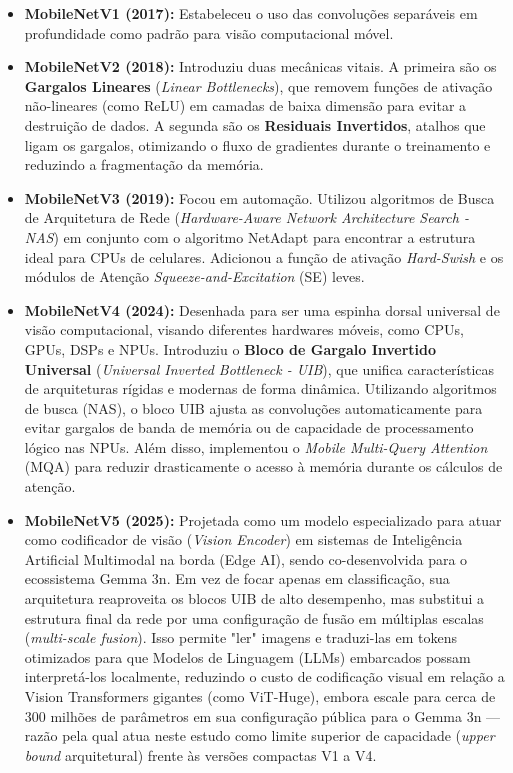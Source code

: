 \documentclass[oneside,english,brazilian]{UNISINOSmonografia}
\begin{document}
\begin{itemize}
    \item \textbf{MobileNetV1 (2017):} Estabeleceu o uso das convoluções separáveis em profundidade como padrão para visão computacional móvel. \cite{howard2017mobilenets_google}
        
    \item \textbf{MobileNetV2 (2018):} Introduziu duas mecânicas vitais. A primeira são os \textbf{Gargalos Lineares} (\textit{Linear Bottlenecks}), que removem funções de ativação não-lineares (como ReLU) em camadas de baixa dimensão para evitar a destruição de dados. A segunda são os \textbf{Residuais Invertidos}, atalhos que ligam os gargalos, otimizando o fluxo de gradientes durante o treinamento e reduzindo a fragmentação da memória. \cite{sandler2018mobilenetv2_google}
        
    \item \textbf{MobileNetV3 (2019):} Focou em automação. Utilizou algoritmos de Busca de Arquitetura de Rede (\textit{Hardware-Aware Network Architecture Search - NAS}) em conjunto com o algoritmo NetAdapt para encontrar a estrutura ideal para CPUs de celulares. Adicionou a função de ativação \textit{Hard-Swish} e os módulos de Atenção \textit{Squeeze-and-Excitation} (SE) leves. \cite{howard2019mobilenetv3_google}
        
    \item \textbf{MobileNetV4 (2024):} Desenhada para ser uma espinha dorsal universal de visão computacional, visando diferentes hardwares móveis, como CPUs, GPUs, DSPs e NPUs. Introduziu o \textbf{Bloco de Gargalo Invertido Universal} (\textit{Universal Inverted Bottleneck - UIB}), que unifica características de arquiteturas rígidas e modernas de forma dinâmica. Utilizando algoritmos de busca (NAS), o bloco UIB ajusta as convoluções automaticamente para evitar gargalos de banda de memória ou de capacidade de processamento lógico nas NPUs. Além disso, implementou o \textit{Mobile Multi-Query Attention} (MQA) para reduzir drasticamente o acesso à memória durante os cálculos de atenção. \cite{qin2024mobilenetv4_google}

    \item \textbf{MobileNetV5 (2025):} Projetada como um modelo especializado para atuar como codificador de visão (\textit{Vision Encoder}) em sistemas de Inteligência Artificial Multimodal na borda (Edge AI), sendo co-desenvolvida para o ecossistema Gemma 3n. Em vez de focar apenas em classificação, sua arquitetura reaproveita os blocos UIB de alto desempenho, mas substitui a estrutura final da rede por uma configuração de fusão em múltiplas escalas (\textit{multi-scale fusion}). Isso permite "ler" imagens e traduzi-las em tokens otimizados para que Modelos de Linguagem (LLMs) embarcados possam interpretá-los localmente, reduzindo o custo de codificação visual em relação a Vision Transformers gigantes (como ViT-Huge), embora escale para cerca de 300 milhões de parâmetros em sua configuração pública para o Gemma 3n — razão pela qual atua neste estudo como limite superior de capacidade (\textit{upper bound} arquitetural) frente às versões compactas V1 a V4. \cite{wightman2025mobilenetv5_google}
\end{itemize}
\end{document}
